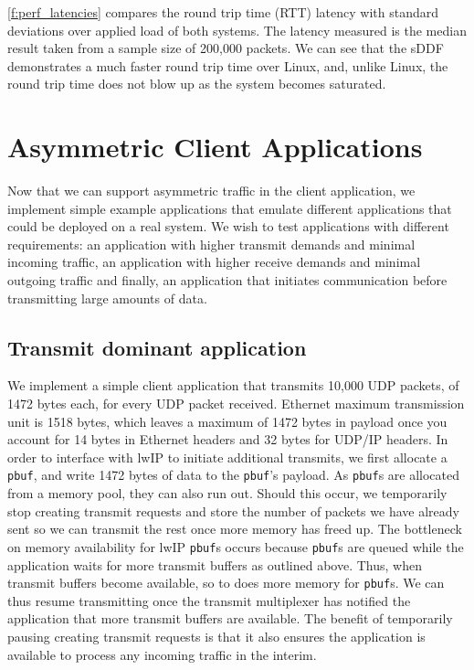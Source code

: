 \autoref{f:perf_latencies} compares the round trip time (RTT) latency with standard deviations over applied load of both systems. The latency measured
is the median result taken from a sample size of 200,000 packets. We can see that the sDDF demonstrates a much faster round trip time over Linux, 
and, unlike Linux, the round trip time does not blow up as the system becomes saturated. 

\section{Asymmetric Client Applications}

Now that we can support asymmetric traffic in the client application, we implement simple example applications that emulate different
applications that could be deployed on a real system. We wish to test applications with different requirements: 
an application with higher transmit demands and minimal incoming traffic, an application with higher receive demands and minimal outgoing traffic
and finally, an application that initiates communication before transmitting large amounts of data.

\subsection{Transmit dominant application}\label{s:transmit_dom}
We implement a simple client application that transmits 10,000 UDP packets, of 1472 bytes each, for every UDP packet received.
Ethernet maximum transmission unit is 1518 bytes, which leaves a maximum of 1472 bytes in payload once you account for 14 bytes
in Ethernet headers and 32 bytes for UDP/IP headers. 
In order to interface with lwIP to initiate additional transmits, we first allocate a \texttt{pbuf}, and write 1472 bytes of data
to the \texttt{pbuf}'s payload. As \texttt{pbuf}s are allocated from a memory pool, they can also run out. Should this occur, we temporarily
stop creating transmit requests and store the number of packets we have already sent so we can transmit the rest once more 
memory has freed up. The bottleneck on memory availability for lwIP \texttt{pbuf}s occurs because \texttt{pbuf}s are queued while the application
waits for more transmit buffers as outlined above. Thus, when transmit buffers become available, so to does more memory for
\texttt{pbuf}s. We can thus resume transmitting once the transmit multiplexer has notified the application that more
transmit buffers are available. The benefit of temporarily pausing creating transmit requests is that it also ensures the application
is available to process any incoming traffic in the interim. 

